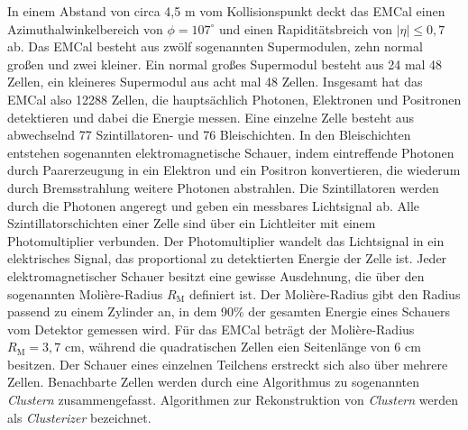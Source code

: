 In einem Abstand von circa 4,5 m vom Kollisionspunkt deckt das EMCal einen Azimuthalwinkelbereich von $\phi=107^{\circ}$ und einen Rapidit\"atsbreich von $ |\eta| \leq 0,7$ ab.
Das EMCal besteht aus zw\"olf sogenannten Supermodulen, zehn normal gro{\ss}en und zwei kleiner.
Ein normal gro{\ss}es Supermodul besteht aus 24 mal 48 Zellen, ein kleineres Supermodul aus acht mal 48 Zellen.
Insgesamt hat das EMCal also 12288 Zellen, die haupts\"achlich Photonen, Elektronen und Positronen detektieren und dabei die Energie messen.
Eine einzelne Zelle besteht aus abwechselnd 77 Szintillatoren- und 76 Bleischichten.
In den Bleischichten entstehen sogenannten elektromagnetische Schauer, indem eintreffende Photonen durch Paarerzeugung in ein Elektron und ein Positron konvertieren, die wiederum durch Bremsstrahlung weitere Photonen abstrahlen.
Die Szintillatoren werden durch die Photonen angeregt und geben ein messbares Lichtsignal ab.
Alle Szintillatorschichten einer Zelle sind \"uber ein Lichtleiter mit einem Photomultiplier verbunden.
Der Photomultiplier wandelt das Lichtsignal in ein elektrisches Signal, das proportional zu detektierten Energie der Zelle ist.
\newline
Jeder elektromagnetischer Schauer besitzt eine gewisse Ausdehnung, die \"uber den sogenannten Moli\`ere-Radius $R_{\text{M}}$ definiert ist.
Der Moli\`ere-Radius gibt den Radius passend zu einem Zylinder an, in dem 90\% der gesamten Energie eines Schauers vom Detektor gemessen wird.
F\"ur das EMCal betr\"agt der Moli\`ere-Radius $R_{\text{M}} = 3,7$ cm, w\"ahrend die quadratischen Zellen eien Seitenl\"ange von 6 cm besitzen. 
Der Schauer eines einzelnen Teilchens erstreckt sich also \"uber mehrere Zellen.
Benachbarte Zellen werden durch eine Algorithmus zu sogenannten \textit{Clustern} zusammengefasst.
Algorithmen zur Rekonstruktion von \textit{Clustern} werden als \textit{Clusterizer} bezeichnet.
